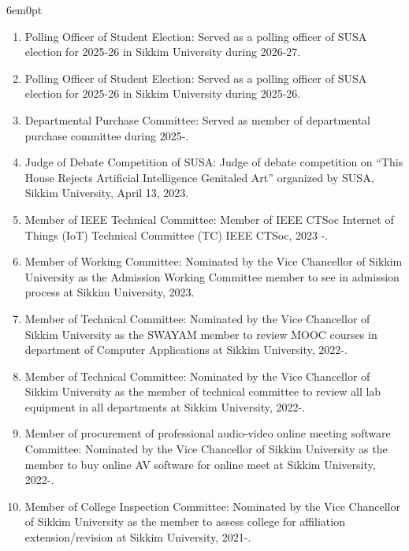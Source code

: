 \documentclass[11pt,a4paper]{moderncv}
\begin{document}
\begin{adjustwidth}{6em}{0pt}
	\begin{enumerate}
		

		\item Polling Officer of Student Election: Served as a polling officer of SUSA election for 2025-26 in Sikkim University during 2026-27.
		
		\item Polling Officer of Student Election: Served as a polling officer of SUSA election for 2025-26 in Sikkim University during 2025-26.
		
		\item Departmental Purchase Committee: Served as member of departmental purchase committee during 2025-.
		
		\item Judge of Debate Competition of SUSA: Judge of debate competition on “This House Rejects Artificial Intelligence Genitaled Art” organized by SUSA, Sikkim University, April 13, 2023.
		
		\item Member of IEEE Technical Committee: Member of IEEE CTSoc Internet of Things (IoT) Technical Committee (TC) IEEE CTSoc, 2023 -.
		
		\item Member of Working Committee: Nominated by the Vice Chancellor of Sikkim University as the Admission Working Committee member to see in admission process at Sikkim University, 2023.
		
		\item Member of Technical Committee: Nominated by the Vice Chancellor of Sikkim University as the SWAYAM member to review MOOC courses in department of Computer Applications at Sikkim University, 2022-.
		
		\item Member of Technical Committee: Nominated by the Vice Chancellor of Sikkim University as the member of technical committee to review all lab equipment in all departments at Sikkim University, 2022-.
		
		\item Member of procurement of professional audio-video online meeting software Committee: Nominated by the Vice Chancellor of Sikkim University as the member to buy online AV software for online meet at Sikkim University, 2022-.
		
		\item Member of College Inspection Committee: Nominated by the Vice Chancellor of Sikkim University as the member to assess college for affiliation extension/revision at Sikkim University, 2021-.
		

\end{enumerate}
\end{adjustwidth}
\end{document}
